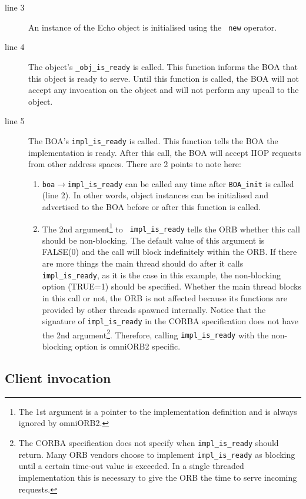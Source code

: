 \documentclass[11pt,twoside,onecolumn]{book}
\begin{document}
\begin{description}
\item[line 3] An instance of the Echo object is initialised using the {\tt
new} operator.
\item[line 4] The object's {\tt \_obj\_is\_ready} is called. 
This function informs the BOA that this object is ready to serve. Until
this function is called, the BOA will not accept any invocation on the
object and will not perform any upcall to the object.
\item[line 5] The BOA's {\tt impl\_is\_ready} is called. This function tells
the BOA the implementation is ready. After this call, the BOA will accept
IIOP requests from other address spaces. There are 2 points to note here:
\begin{enumerate}
\item {\tt boa$\rightarrow$impl\_is\_ready} can be called any time after
{\tt BOA\_init} is called (line 2). In other words, object instances can be
initialised and advertised to the BOA before or after this function is
called. 
\item The 2nd argument\footnote{The 1st argument is a pointer to the
implementation definition and is always ignored by omniORB2.} to {\tt
impl\_is\_ready} tells the ORB whether this call should be
non-blocking. The default value of this argument is FALSE(0) and the call
will block indefinitely within the ORB. If there are more things the main
thread should do after it calls {\tt impl\_is\_ready}, as it is the case in
this example, the non-blocking option (TRUE=1) should be specified. Whether
the main thread blocks in this call or not, the ORB is not affected because
its functions are provided by other threads spawned internally.  Notice
that the signature of {\tt impl\_is\_ready} in the CORBA specification does
not have the 2nd argument\footnote{The CORBA specification does not specify
when {\tt impl\_is\_ready} should return. Many ORB vendors choose to
implement {\tt impl\_is\_ready} as blocking until a certain time-out value
is exceeded. In a single threaded implementation this is necessary to give
the ORB the time to serve incoming requests.}. Therefore, calling
{\tt impl\_is\_ready} with the non-blocking option is omniORB2 specific.
\end{enumerate}
\end{description}

\subsection{Client invocation}
\end{document}
